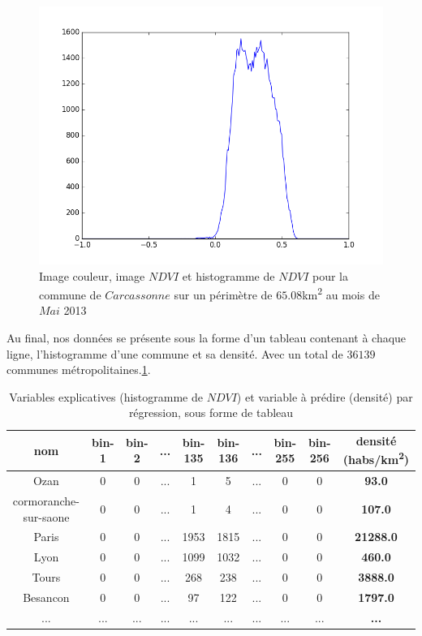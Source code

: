 \documentclass{book}
\begin{document}
\begin{figure}[H]
{}
\begin{center}
\includegraphics[scale=0.45]{images/05_ndvi_histo.png}
\end{center}
\caption{Image couleur, image $NDVI$ et histogramme de $NDVI$ pour la commune de $Carcassonne$ sur un périmètre de $65.08$km\textsuperscript{2} au mois de $Mai$ 2013}
\label{ndvi_extraction}
\end{figure}

\clearpage

Au final, nos données se présente sous la forme d'un tableau contenant à chaque ligne, l'histogramme d'une commune et sa densité. Avec un total
de $36139$ communes métropolitaines.\ref{data_reg}.

\begin{table}[H]
\begin{center}
\begin{adjustbox}{max width=\textwidth}
\begin{tabular}{|c|c|c|c|c|c|c|c|c|>{\bfseries}c|}

\hline 
nom &  bin-1 & bin-2 & ... & bin-135 & bin-136 &... & bin-255 & bin-256 & densité (habs/km\textsuperscript{2}) \\
\hline 
Ozan & 0 & 0 & ... & 1 & 5 & ... & 0 & 0 & 93.0\\
\hline 
cormoranche-sur-saone & 0 & 0 & ... & 1 & 4 & ... & 0 & 0 & 107.0\\
\hline 
Paris & 0 & 0 & ... & 1953 & 1815 & ... & 0 & 0 & 21288.0\\
\hline
Lyon & 0 & 0 & ... & 1099 & 1032 & ... & 0 & 0 & 460.0\\
\hline
Tours & 0 & 0 & ... & 268 & 238 & ... & 0 & 0 & 3888.0\\
\hline
Besancon & 0 & 0 & ... & 97 & 122 & ... & 0 & 0 & 1797.0\\
\hline 
... & ... & ... & ... & ... & ... & ... & ... & ... & ... \\
\hline
\end{tabular}
\end{adjustbox}
\end{center}
\caption{Variables explicatives (histogramme de $NDVI$) et variable à prédire (densité) par régression, sous forme de tableau}
\label{data_reg}
\end{table}
\end{document}
